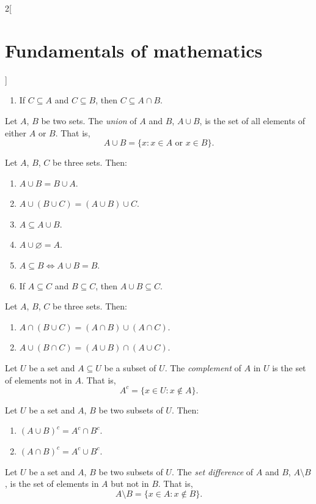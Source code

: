 \documentclass[../../../main.tex]{subfiles}
\begin{document}
\begin{multicols}{2}[\section{Fundamentals of mathematics}]
\begin{prop}
\begin{enumerate}
      \item If $C\subseteq A$ and $C\subseteq B$, then $C\subseteq A\cap B$.
    \end{enumerate}
  \end{prop}
  \begin{definition}
    Let $A$, $B$ be two sets. The \emph{union} of $A$ and $B$, $A\cup B$, is the set of all elements of either $A$ or $B$. That is, $$A\cup B=\{x:x\in A\text{ or }x\in B\}.$$
  \end{definition}
  \begin{prop}
    Let $A$, $B$, $C$ be three sets. Then:
    \begin{enumerate}
      \item $A\cup B=B\cup A$.
      \item $A\cup(B\cup C)=(A\cup B)\cup C$.
      \item $A\subseteq A\cup B$.
      \item $A\cup\varnothing=A$.
      \item $A\subseteq B\iff A\cup B=B$.
      \item If $A\subseteq C$ and $B\subseteq C$, then $A\cup B\subseteq C$.
    \end{enumerate}
  \end{prop}
  \begin{prop}
    Let $A$, $B$, $C$ be three sets. Then:
    \begin{enumerate}
      \item $A\cap (B\cup C)=(A\cap B)\cup (A\cap C)$.
      \item $A\cup (B\cap C)=(A\cup B)\cap (A\cup C)$.
    \end{enumerate}
  \end{prop}
  \begin{definition}
    Let $U$ be a set and $A\subseteq U$ be a subset of $U$. The \emph{complement} of $A$ in $U$ is the set of elements not in $A$. That is, $$A^c=\{x\in U:x\notin A\}.$$
  \end{definition}
  \begin{prop}
    Let $U$ be a set and $A$, $B$ be two subsets of $U$. Then:
    \begin{enumerate}
      \item $(A\cup B)^c=A^c\cap B^c$.
      \item $(A\cap B)^c=A^c\cup B^c$.
    \end{enumerate}
  \end{prop}
  \begin{definition}
    Let $U$ be a set and $A$, $B$ be two subsets of $U$. The \emph{set difference} of $A$ and $B$, $A\setminus B$, is the set of elements in $A$ but not in $B$. That is, $$A\setminus B=\{x\in A:x\notin B\}.$$

\end{definition}
\end{multicols}
\end{document}
